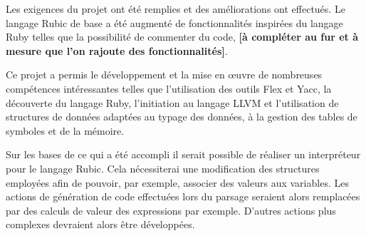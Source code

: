 \documentclass[12pt]{article}
\begin{document}
Les exigences du projet ont été remplies et des améliorations ont effectués.
Le langage Rubic de base a été augmenté de fonctionnalités inspirées du
langage Ruby telles que la possibilité de commenter du code, \textbf{[à compléter au
fur et à mesure que l'on rajoute des fonctionnalités]}.

Ce projet a permis le développement et la mise en œuvre de nombreuses
compétences intéressantes telles que l'utilisation des outils Flex et Yacc, la
découverte du langage Ruby, l'initiation au langage LLVM et l'utilisation de
structures de données adaptées au typage des données, à la gestion des tables
de symboles et de la mémoire.

Sur les bases de ce qui a été accompli il serait possible de réaliser un
interpréteur pour le langage Rubic. Cela nécessiterai une modification des
structures employées afin de pouvoir, par exemple, associer des valeurs aux
variables. Les actions de génération de code effectuées lors du parsage
seraient alors remplacées par des calculs de valeur des expressions par
exemple. D'autres actions plus complexes devraient alors être développées.
\end{document}
